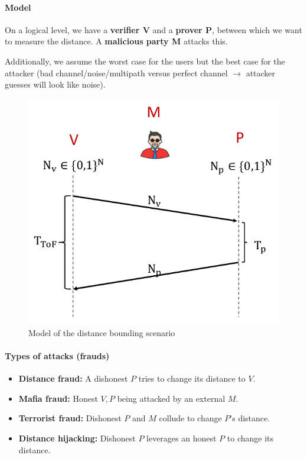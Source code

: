 \paragraph{Model}
On a logical level, we have a \textbf{verifier V} and a \textbf{prover P}, between which we want to measure the distance.
A \textbf{malicious party M} attacks this.


Additionally, we assume the worst case for the users but the best case for the attacker (bad channel/noise/multipath versus perfect channel $\rightarrow$ attacker guesses will look like noise).

\begin{figure}[h]
	\centering
	\includegraphics[scale=0.4]{images/5-model.png}
	\caption{Model of the distance bounding scenario}%
	\label{fig:ranging-model}
\end{figure}

\paragraph{Types of attacks (frauds)}
\begin{itemize}
	\item \textbf{Distance fraud:} A dishonest $P$ tries to change its distance to $V$.
	\item \textbf{Mafia fraud:} Honest $V, P$ being attacked by an external $M$.
	\item \textbf{Terrorist fraud:} Dishonest $P$ and $M$ collude to change $P$'s distance.
	\item \textbf{Distance hijacking:} Dishonest $P$ leverages an honest $P$ to change its distance.
\end{itemize}

